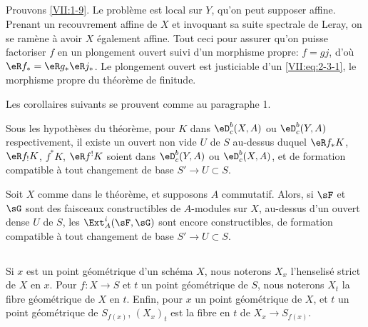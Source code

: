 \subsection{}\label{VII:2-8}

Prouvons \ref{VII:1-9}. Le problème est local sur $Y$, qu'on peut supposer 
affine. Prenant un recouvrement affine de $X$ et invoquant sa suite spectrale 
de Leray, on se ramène à avoir $X$ également affine. Tout ceci pour 
assurer qu'on puisse factoriser $f$ en un plongement ouvert suivi d'un 
morphisme propre: $f=g j$, d'où $\eR f_\ast = \eR g_\ast \eR j_\ast$. Le 
plongement ouvert est justiciable d'un \eqref{VII:eq:2-3-1}, le morphisme 
propre du théorème de finitude. 

Les corollaires suivants se prouvent comme au paragraphe 1. 





\begin{corollary_}\label{VII:2-9}
Sous les hypothèses du théorème, pour $K$ dans $\eD_c^b(X,A)$ ou 
$\eD_c^b(Y,A)$ respectivement, il existe un ouvert non vide $U$ de $S$ 
au-dessus duquel $\eR f_\ast K$, $\eR f_! K$, $f^\ast K$, $\eR f^! K$ soient 
dans $\eD_c^b(Y,A)$ ou $\eD_c^b(X,A)$, et de formation compatible à tout 
changement de base $S' \to U\subset S$. 
\end{corollary_}





\begin{corollary_}\label{VII:2-10}
Soit $X$ comme dans le théorème, et supposons $A$ commutatif. Alors, si 
$\sF$ et $\sG$ sont des faisceaux constructibles de $A$-modules sur $X$, 
au-dessus d'un ouvert dense $U$ de $S$, les $\Ext_A^i(\sF,\sG)$ sont encore 
constructibles, de formation compatible à tout changement de base 
$S' \to U\subset S$. 
\end{corollary_}





\subsection{}\label{VII:2-11}

Si $x$ est un point géométrique d'un schéma $X$, nous noterons $X_x$ 
l'henselisé strict de $X$ en $x$. Pour $f:X\to S$ et $t$ un point 
géométrique de $S$, nous noterons $X_t$ la fibre géométrique de $X$ en 
$t$. Enfin, pour $x$ un point géométrique de $X$, et $t$ un point 
géométrique de $S_{f(x)}$, $(X_x)_t$ est la fibre en $t$ de 
$X_x \to S_{f(x)}$. 





